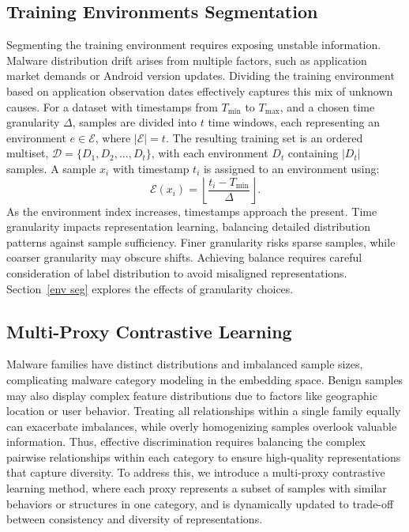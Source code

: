 \subsection{Training Environments Segmentation}
\label{environment_split}
Segmenting the training environment requires exposing unstable information. Malware distribution drift arises from multiple factors, such as application market demands or Android version updates. Dividing the training environment based on application observation dates effectively captures this mix of unknown causes. For a dataset with timestamps from $T_{\min}$ to $T_{\max}$, and a chosen time granularity $\Delta$, samples are divided into $t$ time windows, each representing an environment $e \in \mathcal{E}$, where $|\mathcal{E}| = t$. The resulting training set is an ordered multiset, $\mathcal{D} = \{D_1,D_2,...,D_t\}$, with each environment $D_t$ containing $|D_t|$ samples. A sample $x_i$ with timestamp $t_i$ is assigned to an environment using:
\begin{equation}
\mathcal{E}(x_i)=\left\lfloor\frac{t_i-T_{\min }}{\Delta}\right\rfloor.
\end{equation}
As the environment index increases, timestamps approach the present. Time granularity impacts representation learning, balancing detailed distribution patterns against sample sufficiency. Finer granularity risks sparse samples, while coarser granularity may obscure shifts. Achieving balance requires careful consideration of label distribution to avoid misaligned representations. Section~\ref{env seg} explores the effects of granularity choices.

\subsection{Multi-Proxy Contrastive Learning}
\label{multi-proxy contrastive learning}
Malware families have distinct distributions and imbalanced sample sizes, complicating malware category modeling in the embedding space. Benign samples may also display complex feature distributions due to factors like geographic location or user behavior. Treating all relationships within a single family equally can exacerbate imbalances, while overly homogenizing samples overlook valuable information. Thus, effective discrimination requires balancing the complex pairwise relationships within each category to ensure high-quality representations that capture diversity. To address this, we introduce a multi-proxy contrastive learning method, where each proxy represents a subset of samples with similar behaviors or structures in one category, and is dynamically updated to trade-off between consistency and diversity of representations.

